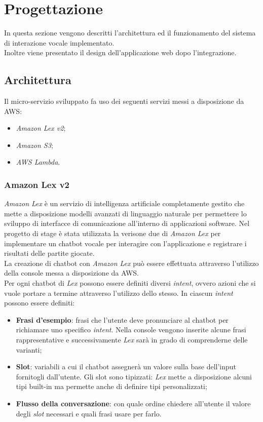 \section{Progettazione}
In questa sezione vengono descritti l'architettura ed il funzionamento del sistema di interazione vocale implementato. \\ 
Inoltre viene presentato il design dell'applicazione web dopo l'integrazione.
	\subsection{Architettura}
	Il micro-servizio sviluppato fa uso dei seguenti servizi messi a disposizione da \gls{AWS}:
	\begin{itemize}
		\item \emph{Amazon Lex v2};
		\item \emph{Amazon S3};
		\item \emph{AWS Lambda}.
	\end{itemize}
		\subsubsection{Amazon Lex v2}
		\emph{Amazon Lex} è un servizio di intelligenza artificiale completamente gestito che mette a disposizione 
		modelli avanzati di linguaggio naturale per permettere lo sviluppo di interfacce di comunicazione all'interno 
		di applicazioni software. Nel progetto di stage è stata utilizzata la verisone due di \emph{Amazon Lex} per 
		implementare un \gls{chatbot} vocale per interagire con l'applicazione e registrare i risultati delle partite 
		giocate. \\
		
		\noindent La creazione di \gls{chatbot} con \emph{Amazon Lex} può essere effettuata attraverso l'utilizzo della console messa a disposizione da \gls{AWS}. \\
		Per ogni \gls{chatbot} di \emph{Lex} possono essere definiti diversi \emph{intent}, ovvero azioni che si
		vuole portare a termine attraverso l'utilizzo dello stesso. In ciascun \emph{intent} possono essere definiti:
		\begin{itemize}
			\item \textbf{Frasi d'esempio}: frasi che l'utente deve pronunciare al \gls{chatbot} per richiamare uno
			specifico \emph{intent}. Nella console vengono inserite alcune frasi rappresentative e successivamente \emph{Lex} sarà in grado di comprenderne delle varianti; 
			\item \textbf{Slot}: variabili a cui il \gls{chatbot} assegnerà un valore sulla base
			dell'input fornitogli dall'utente. Gli slot sono tipizzati:	\emph{Lex} mette a disposizione alcuni tipi built-in ma permette anche di definire tipi personalizzati;
			\item \textbf{Flusso della conversazione}: con quale ordine chiedere all'utente il valore degli \emph{slot} necessari e quali frasi usare per farlo.		
		\end{itemize}
		
